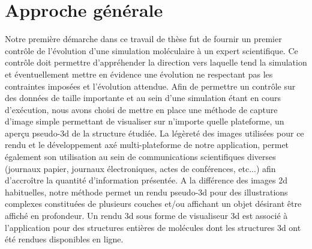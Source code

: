  
\section*{Approche générale}

Notre première démarche dans ce travail de thèse fut de fournir un premier contrôle de l'évolution d'une simulation moléculaire à un expert scientifique. Ce contrôle doit permettre d'appréhender la direction vers laquelle tend la simulation et éventuellement mettre en évidence une évolution ne respectant pas les contraintes imposées et l'évolution attendue. Afin de permettre un contrôle sur des données de taille importante et au sein d'une simulation étant en cours d’exécution, nous avons choisi de mettre en place une méthode de capture d'image simple permettant de visualiser sur n'importe quelle plateforme, un aperçu pseudo-3d de la structure étudiée. La légèreté des images utilisées pour ce rendu et le développement axé multi-plateforme de notre application, permet également son utilisation au sein de communications scientifiques diverses (journaux papier, journaux électroniques, actes de conférences, etc...) afin d’accroître la quantité d'information présentée. A la différence des images 2d habituelles, notre méthode permet un rendu pseudo-3d pour des illustrations complexes constituées de plusieurs couches et/ou affichant un objet désirant être affiché en profondeur. Un rendu 3d sous forme de visualiseur 3d est associé à l'application pour des structures entières de molécules dont les structures 3d ont été rendues disponibles en ligne.

